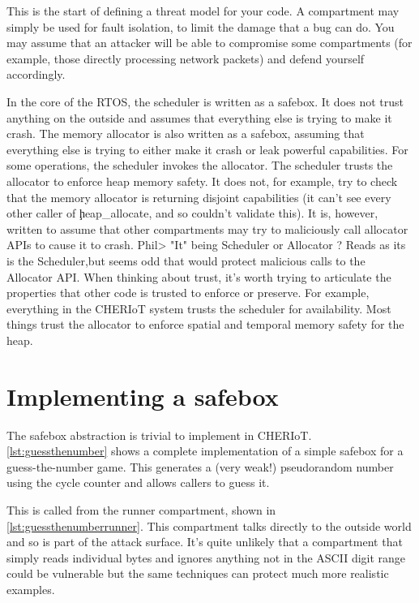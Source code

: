 This is the start of defining a threat model for your code.
A compartment may simply be used for fault isolation, to limit the damage that a bug can do.
You may assume that an attacker will be able to compromise some compartments (for example, those directly processing network packets) and defend yourself accordingly.

In the core of the RTOS, the scheduler is written as a safebox.
It does not trust anything on the outside and assumes that everything else is trying to make it crash.
The memory allocator is also written as a safebox, assuming that everything else is trying to either make it crash or leak powerful capabilities.
For some operations, the scheduler invokes the allocator.
The scheduler trusts the allocator to enforce heap memory safety.
It does not, for example, try to check that the memory allocator is returning disjoint capabilities (it can't see every other caller of \c{heap_allocate}, and so couldn't validate this).
It is, however, written to assume that other compartments may try to maliciously call allocator APIs to cause it to crash.
Phil> "It" being Scheduler or Allocator ? Reads as its is the Scheduler,but seems odd that would protect malicious calls to the Allocator API. 
When thinking about trust, it's worth trying to articulate the properties that other code is trusted to enforce or preserve.
For example, everything in the CHERIoT system trusts the scheduler for availability.
Most things trust the allocator to enforce spatial and temporal memory safety for the heap.

\section{Implementing a safebox}

The safebox abstraction is trivial to implement in CHERIoT.
\ref{lst:guessthenumber} shows a complete implementation of a simple safebox for a guess-the-number game.
This generates a (very weak!) pseudorandom number using the cycle counter and allows callers to guess it.

\codelisting[marker=safebox,caption=A safebox for a guess-the-numbers game,label=lst:guessthenumber, filename=examples/safebox/safebox.cc]{}

This is called from the runner compartment, shown in \ref{lst:guessthenumberrunner}.
This compartment talks directly to the outside world and so is part of the attack surface.
It's quite unlikely that a compartment that simply reads individual bytes and ignores anything not in the ASCII digit range could be vulnerable but the same techniques can protect much more realistic examples.

